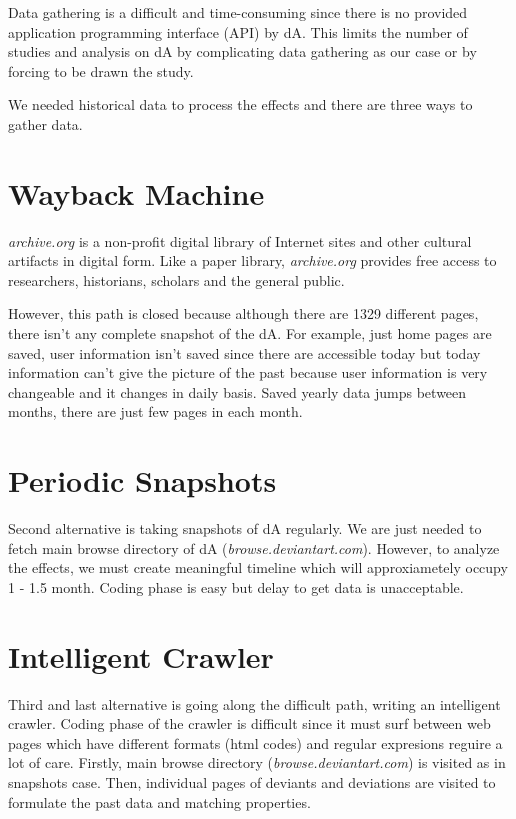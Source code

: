 \documentclass[12pt,a4paper]{report}
\begin{document}
	Data gathering is a difficult and time-consuming since there is no provided application programming interface (API) by dA. This limits the number of studies and analysis on dA by complicating data gathering as our case or by forcing to be drawn the study. 

	We needed historical data to process the effects and there are three ways to gather data.

\section{Wayback Machine}

	\emph{archive.org} is a non-profit digital library of Internet sites and other cultural artifacts in digital form. Like a paper library, \emph{archive.org} provides free access to researchers, historians, scholars and the general public. 

	However, this path is closed because although there are 1329 different pages, there isn't any complete snapshot of the dA. For example, just home pages are saved, user information isn't saved since there are accessible today but today information can't give the picture of the past because user information is very changeable and it changes in daily basis. Saved yearly data jumps between months, there are just few pages in each month.

\section{Periodic Snapshots}

	Second alternative is taking snapshots of dA regularly. We are just needed to fetch main browse directory of dA (\emph{browse.deviantart.com}). However, to analyze the effects, we must create meaningful timeline which will approxiametely occupy 1 - 1.5 month. Coding phase is easy but delay to get data is unacceptable. 

\section{Intelligent Crawler}

	Third and last alternative is going along the difficult path, writing an intelligent crawler. Coding phase of the crawler is difficult since it must surf between web pages which have different formats (html codes) and regular expresions reguire a lot of care. Firstly, main browse directory (\emph{browse.deviantart.com}) is visited as in snapshots case. Then, individual pages of deviants and deviations are visited to formulate the past data and matching properties. \\
\end{document}
